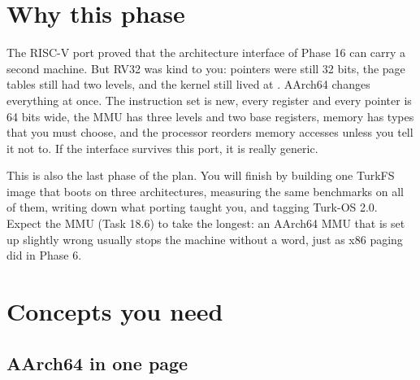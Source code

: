 \documentclass[11pt,a4paper]{article}
\begin{document}
\renewcommand{\progresslabel}{Stage V progress toward Turk-OS 2.0 (this phase in red)}


\section{Why this phase}

The RISC-V port proved that the architecture interface of Phase 16 can carry a second machine. But RV32 was kind to
you: pointers were still 32 bits, the page tables still had two levels, and the kernel still lived at
. AArch64 changes everything at once. The instruction set is new, every register and every pointer
is 64 bits wide, the MMU has three levels and two base registers, memory has types that you must choose, and the
processor reorders memory accesses unless you tell it not to. If the interface survives this port, it is really
generic.

This is also the last phase of the plan. You will finish by building one TurkFS image that boots on three
architectures, measuring the same benchmarks on all of them, writing down what porting taught you, and tagging
Turk-OS 2.0. Expect the MMU (Task 18.6) to take the longest: an AArch64 MMU that is set up slightly wrong usually
stops the machine without a word, just as x86 paging did in Phase 6.

\section{Concepts you need}

\subsection{AArch64 in one page}
\end{document}
